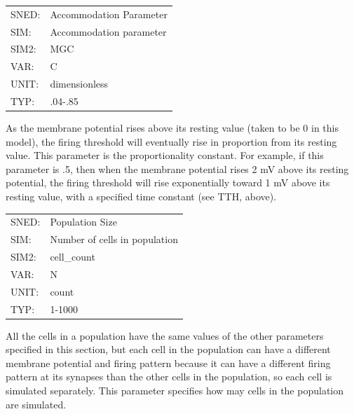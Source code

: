 \documentclass[12pt,openany,oneside]{book}
\begin{document}
\begin{flushleft}
\begin{tabular}{@{}ll@{}}
SNED: & Accommodation Parameter\\
SIM: & Accommodation parameter\\
SIM2: & MGC\\
VAR: & C\\
UNIT: & dimensionless\\
TYP: & .04-.85\\
\end{tabular}
\end{flushleft}
\noindent
As the membrane potential rises above its resting value (taken to be 0
in this model), the firing threshold will eventually rise in
proportion from its resting value.  This parameter is the
proportionality constant.  For example, if this parameter is .5, then
when the membrane potential rises 2 mV above its resting potential,
the firing threshold will rise exponentially toward 1 mV above its
resting value, with a specified time constant (see TTH, above).
\filbreak
\vspace{\baselineskip}

\begin{flushleft}
\begin{tabular}{@{}ll@{}}
SNED: & Population Size\\
SIM: & Number of cells in population\\
SIM2: & cell\_count\\
VAR: & N\\
UNIT: & count\\
TYP: & 1-1000\\
\end{tabular}
\end{flushleft}
\noindent
All the cells in a population have the same values of the other parameters
specified in this section, but each cell in the population can have a
different membrane potential and firing pattern because it can
have a different firing pattern at its synapses than the other cells
in the population, so each cell is simulated separately.  This
parameter specifies how may cells in the population are simulated.
\filbreak
\vspace{\baselineskip}
\end{document}
